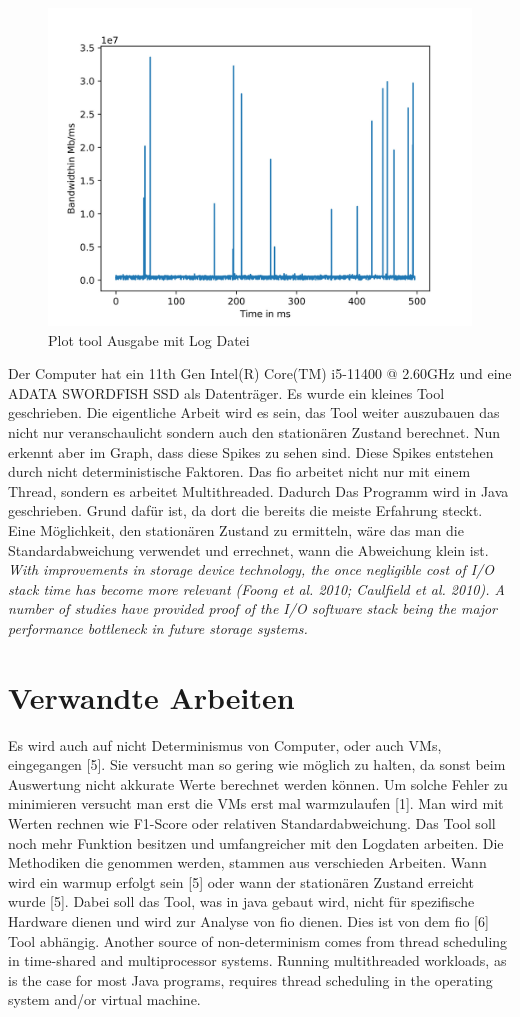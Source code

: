 \documentclass{article}
\begin{document}
\begin{figure}[ht!]
    \centering
    \includegraphics[width=120mm]{./Code/nm_mytest_bw.jpg}
    \caption{Plot tool Ausgabe mit Log Datei  \label{overflow}}
\end{figure}
Der Computer hat ein 11th Gen Intel(R) Core(TM) i5-11400 @ 2.60GHz und eine ADATA SWORDFISH SSD als Datenträger.
Es wurde ein kleines Tool geschrieben. Die eigentliche Arbeit wird es sein, das Tool weiter auszubauen das nicht nur veranschaulicht
sondern auch den stationären Zustand berechnet.
Nun erkennt aber im Graph, dass diese Spikes zu sehen sind. Diese Spikes entstehen durch nicht deterministische Faktoren.
Das fio arbeitet nicht nur mit einem Thread, sondern es arbeitet Multithreaded. Dadurch 
Das Programm wird in Java geschrieben. Grund dafür ist, da dort die bereits die meiste Erfahrung steckt.
Eine Möglichkeit, den stationären Zustand zu ermitteln, wäre das man die Standardabweichung verwendet und errechnet, wann die Abweichung klein ist.
\textit{With improvements in storage device technology, the once negligible cost of I/O stack time has become more relevant (Foong et al. 2010; Caulfield et al. 2010). A number
of studies have provided proof of the I/O software stack being the major performance bottleneck in future storage systems.}
\section{Verwandte Arbeiten}
Es wird auch auf nicht Determinismus von Computer, oder auch VMs, eingegangen [5]. Sie versucht man so gering wie möglich zu halten, da sonst beim Auswertung nicht akkurate Werte
berechnet werden können. Um solche Fehler zu minimieren versucht man erst die VMs erst mal warmzulaufen [1]. Man wird mit Werten rechnen wie F1-Score oder relativen Standardabweichung.
Das Tool soll noch mehr Funktion besitzen und umfangreicher mit den Logdaten arbeiten. Die Methodiken die genommen werden, stammen aus verschieden Arbeiten. Wann wird ein warmup erfolgt sein [5]
oder wann der stationären Zustand erreicht wurde [5]. Dabei soll das Tool, was in java gebaut wird, nicht für spezifische Hardware dienen und wird zur Analyse von fio dienen. Dies ist von dem fio [6] Tool abhängig.
Another source of non-determinism comes from thread scheduling in time-shared and multiprocessor systems. Running multithreaded
workloads, as is the case for most Java programs, requires thread scheduling in the operating system and/or virtual machine.  
\end{document}
